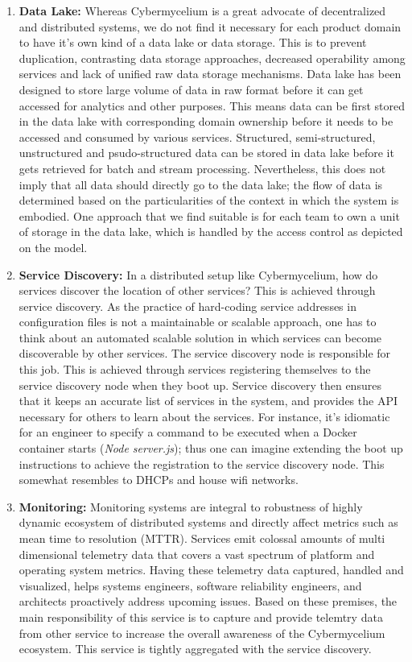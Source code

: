 \documentclass[review]{elsarticle}
\begin{document}
\begin{enumerate}
    \item \textbf{Data Lake:} Whereas Cybermycelium is a great advocate of decentralized and distributed systems, we do not find it necessary for each product domain to have it's own kind of a data lake or data storage. This is to prevent duplication, contrasting data storage approaches, decreased operability among services and lack of unified raw data storage mechanisms. Data lake has been designed to store large volume of data in raw format before it can get accessed for analytics and other purposes. This means data can be first stored in the data lake with corresponding domain ownership before it needs to be accessed and consumed by various services. Structured, semi-structured, unstructured and psudo-structured data can be stored in data lake before it gets retrieved for batch and stream processing. Nevertheless, this does not imply that all data should directly go to the data lake; the flow of data is determined based on the particularities of the context in which the system is embodied. One approach that we find suitable is for each team to own a unit of storage in the data lake, which is handled by the access control as depicted on the model.
    \item \textbf{Service Discovery:} In a distributed setup like Cybermycelium, how do services discover the location of other services? This is achieved through service discovery. As the practice of hard-coding service addresses in configuration files is not a maintainable or scalable approach, one has to think about an automated scalable solution in which services can become discoverable by other services. The service discovery node is responsible for this job. This is achieved through services registering themselves to the service discovery node when they boot up. Service discovery then ensures that it keeps an accurate list of services in the system, and provides the API necessary for others to learn about the services. For instance, it's idiomatic for an engineer to specify a command to be executed when a Docker container starts (\emph{Node server.js}); thus one can imagine extending the boot up instructions to achieve the registration to the service discovery node. This somewhat resembles to DHCPs and house wifi networks.
    \item \textbf{Monitoring:} Monitoring systems are integral to robustness of highly dynamic ecosystem of distributed systems and directly affect metrics such as mean time to resolution (MTTR). Services emit colossal amounts of multi dimensional telemetry data that covers a vast spectrum of platform and operating system metrics. Having these telemetry data captured, handled and visualized, helps systems engineers, software reliability engineers, and architects proactively address upcoming issues. Based on these premises, the main responsibility of this service is to capture and provide telemtry data from other service to increase the overall awareness of the Cybermycelium ecosystem. This service is tightly aggregated with the service discovery.
\end{enumerate}
\end{document}
